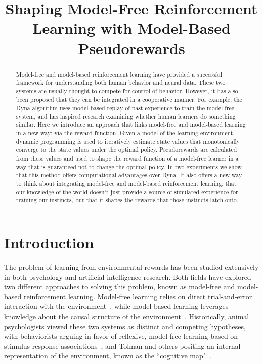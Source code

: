 \documentclass[letterpaper]{article}
\begin{document}
%

\title{Shaping Model-Free Reinforcement Learning with Model-Based Pseudorewards}
\date{}
\maketitle
\begin{abstract}
Model-free and model-based reinforcement learning have provided a successful framework for understanding both human behavior and neural data. These two systems are usually thought to compete for control of behavior. However, it has also been proposed that they can be integrated in a cooperative manner. For example, the Dyna algorithm uses model-based replay of past experience to train the model-free system, and has inspired research examining whether human learners do something similar. Here we introduce an approach that links model-free and model-based learning in a new way: via the reward function. Given a model of the learning environment, dynamic programming is used to iteratively estimate state values that monotonically converge to the state values under the optimal policy. Pseudorewards are calculated from these values and used to shape the reward function of a model-free learner in a way that is guaranteed not to change the optimal policy. In two experiments we show that this method offers computational advantages over Dyna. It also offers a new way to think about integrating model-free and model-based reinforcement learning: that our knowledge of the world doesn't just provide a source of simulated experience for training our instincts, but that it shapes the rewards that those instincts latch onto.
\end{abstract}

\section{Introduction}

The problem of learning from environmental rewards has been studied extensively in both psychology and artificial intelligence research. Both fields have explored two different approaches to solving this problem, known as model-free and model-based reinforcement learning. Model-free learning relies on direct trial-and-error interaction with the environment~\cite{sutton1992reinforcement}, while model-based learning leverages knowledge about the causal structure of the environment~\cite{barto1995learning}. Historically, animal psychologists viewed these two systems as distinct and competing hypotheses, with behaviorists arguing in favor of reflexive, model-free learning based on stimulus-response associations~\cite{thorndike1933proof}, and Tolman and others positing an internal representation of the environment, known as the ``cognitive map"~\cite{tolman1948cognitive}.
\end{document}
